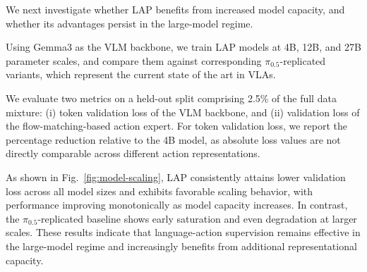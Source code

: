 We next investigate whether LAP benefits from increased model capacity, and whether its advantages persist in the large-model regime.

Using Gemma3 \cite{gemmateam2025gemma3technicalreport} as the VLM backbone, we train LAP models at 4B, 12B, and 27B parameter scales, and compare them against corresponding $\pi_{0.5}$-replicated variants, which represent the current state of the art in VLAs.

We evaluate two metrics on a held-out split comprising 2.5\% of the full data mixture: (i) token validation loss of the VLM backbone, and (ii) validation loss of the flow-matching-based action expert. For token validation loss, we report the percentage reduction relative to the 4B model, as absolute loss values are not directly comparable across different action representations. 

As shown in Fig.~\ref{fig:model-scaling}, LAP consistently attains lower validation loss across all model sizes and exhibits favorable scaling behavior, with performance improving monotonically as model capacity increases. In contrast, the $\pi_{0.5}$-replicated baseline shows early saturation and even degradation at larger scales. These results indicate that language-action supervision remains effective in the large-model regime and increasingly benefits from additional representational capacity.



